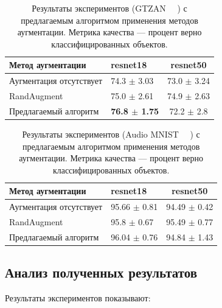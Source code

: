\documentclass[12pt, fleqn]{article}
\begin{document}
\begin{table}[ht!]
    \centering
	\begin{tabular}{| l | l | c |}
    	\hline
	    Метод аугментации & resnet18 & resnet50 \\ \hline
	    Аугментация отсутствует  & 74.3 $\pm$ 3.03 & 73.0 $\pm$ 3.24 \\ \hline
	    RandAugment ~\cite{RandAugment} & 75.0 $\pm$ 2.61 & 74.9 $\pm$ 2.63 \\ \hline
	    Предлагаемый алгоритм & \textbf{76.8 $\pm$ 1.75} & 72.2 $\pm$ 2.8 \\ \hline
	\end{tabular}
	\caption{Результаты экспериментов (GTZAN ~\cite{GTZAN_Article}~\cite{GTZAN_kaggle}) с предлагаемым алгоритмом применения методов аугментации. Метрика качества --- процент верно классифицированных объектов.}
	\label{table:lukianov_pavel_t4}
\end{table}

\begin{table}[ht!]
    \centering
	\begin{tabular}{| l | l | c |}
    	\hline
	    Метод аугментации & resnet18 & resnet50 \\ \hline
	    Аугментация отсутствует  & 95.66 $\pm$ 0.81 & 94.49 $\pm$ 0.42 \\ \hline
	    RandAugment ~\cite{RandAugment} & 95.8 $\pm$ 0.67 & 95.49 $\pm$ 0.77 \\ \hline
	    Предлагаемый алгоритм & 96.04 $\pm$ 0.76 & 94.84 $\pm$ 1.43 \\ \hline
	\end{tabular}
	\caption{Результаты экспериментов (Audio MNIST ~\cite{AudioMnistArticle}~\cite{AudioMnistKaggle}) с предлагаемым алгоритмом применения методов аугментации. Метрика качества --- процент верно классифицированных объектов.}
	\label{table:lukianov_pavel_t3}
\end{table}


\newpage
\subsection{Анализ полученных результатов}

Результаты экспериментов показывают:
\end{document}
